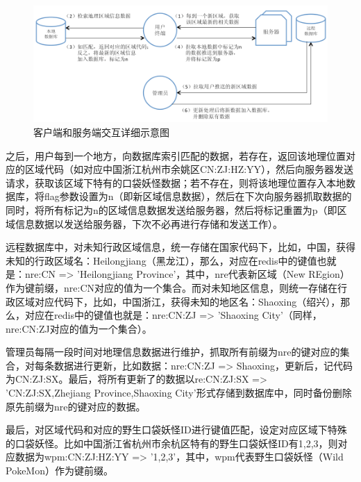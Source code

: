 \documentclass{article}
\begin{document}
\begin{CJK}{UTF8}{gbsn}
   \begin{figure}[htbp]
		\centering
		\includegraphics[bb=0 0 548 341, scale=0.45]{figure/fig_n20.png}
		\caption{客户端和服务端交互详细示意图}
		\label{fig:n20}
	\end{figure}

  之后，用户每到一个地方，向数据库索引匹配的数据，若存在，返回该地理位置对应的区域代码（如对应中国浙江杭州市余姚区CN:ZJ:HZ:YY），然后向服务器发送请求，获取该区域下特有的口袋妖怪数据；若不存在，则将该地理位置存入本地数据库，将flag参数设置为n（即新区域信息数据），然后在下次向服务器抓取数据的同时，将所有标记为n的区域信息数据发送给服务器，然后将标记重置为p（即区域信息数据以发送给服务器，下次不必再进行存储和发送工作）。

  远程数据库中，对未知行政区域信息，统一存储在国家代码下，比如，中国，获得未知的行政区域名：Heilongjiang（黑龙江），那么，对应在redis中的键值也就是：nre:CN => 'Heilongjiang Province'，其中，nre代表新区域（New REgion）作为键前缀，nre:CN对应的值为一个集合。而对未知地区信息，则统一存储在行政区域对应代码下，比如，中国浙江，获得未知的地区名：Shaoxing（绍兴），那么，对应在redis中的键值也就是：nre:CN:ZJ => 'Shaoxing City'（同样，nre:CN:ZJ对应的值为一个集合）。

  管理员每隔一段时间对地理信息数据进行维护，抓取所有前缀为nre的键对应的集合，对每条数据进行更新，比如数据：nre:CN:ZJ => Shaoxing，更新后，记代码为CN:ZJ:SX。最后，将所有更新了的数据以re:CN:ZJ:SX => 'CN:ZJ:SX,Zhejiang Province,Shaoxing City'形式存储到数据库中，同时备份删除原先前缀为nre的键对应的数据。

  最后，对区域代码和对应的野生口袋妖怪ID进行键值匹配，设定对应区域下特殊的口袋妖怪。比如中国浙江省杭州市余杭区特有的野生口袋妖怪ID有1,2,3，则对应数据为wpm:CN:ZJ:HZ:YY => '1,2,3'，其中，wpm代表野生口袋妖怪（Wild PokeMon）作为键前缀。


\end{CJK}
\end{document}
